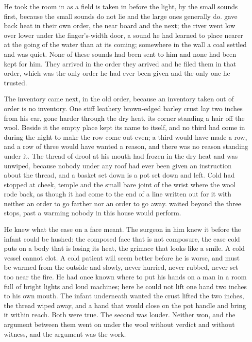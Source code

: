 He took the room in as a field is taken in before the light, by the small sounds first, because the small sounds do not lie and the large ones generally do.  gave back heat in their own order, the near board and the next; the river went low over lower under the finger's-width door, a sound he had learned to place nearer at the going of the water than at its coming; somewhere in the wall a coal settled and was quiet. None of these sounds had been sent to him and none had been kept for him. They arrived in the order they arrived and he filed them in that order, which was the only order he had ever been given and the only one he trusted.

The inventory came next, in the old order, because an inventory taken out of order is no inventory. One stiff leathery brown-edged barley crust lay two inches from his ear, gone harder through the dry heat, its corner standing a hair off the wool. Beside it the empty place kept its name to itself, and no third had come in during the night to make the row come out even; a third would have made a row, and a row of three would have wanted a reason, and there was no reason standing under it. The thread of drool at his mouth had frozen in the dry heat and was unwiped, because nobody under any roof had ever been given an instruction about the thread, and a basket set down is a pot set down and left. Cold had stopped at cheek, temple and the small bare joint of the wrist where the wool rode back, as though it had come to the end of a line written out for it with neither an order to go farther nor an order to go away.  waited beyond the three stops, past a warming nobody in this house would perform.

He knew what the ease on a face meant. The surgeon in him knew it before the infant could be hushed: the composed face that is not composure, the ease cold puts on a body that is losing its heat, the grimace that looks like a smile. A cold vessel cannot clot. A cold patient will seem better before he is worse, and must be warmed from the outside and slowly, never hurried, never rubbed, never set too near the fire. He had once known where to put his hands on a man in a room full of bright lights and loud machines; here he could not lift one hand two inches to his own mouth. The infant underneath wanted the crust lifted the two inches, the thread wiped away, and a hand that would close on the pot handle and bring it within reach. Both were true. The second was louder. Neither won, and the argument between them went on under the wool without verdict and without witness, and the argument was the work.

